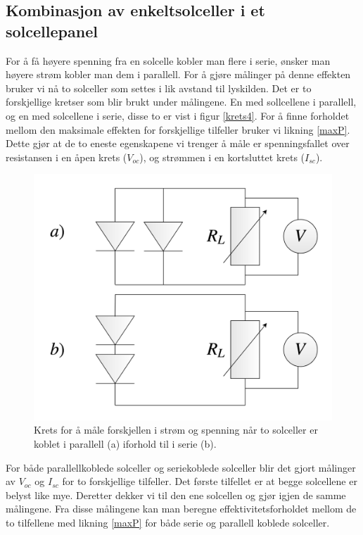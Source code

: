 \documentclass[%
 reprint,
 amsmath,amssymb,
 aps,
 norsk,
 booktabs
]{revtex4-1}
\begin{document}
\subsection{Kombinasjon av enkeltsolceller i et solcellepanel}
For å få høyere spenning fra en solcelle kobler man flere i serie, ønsker man høyere strøm kobler man dem i parallell. For å gjøre målinger på denne effekten bruker vi nå to solceller som settes i lik avstand til lyskilden. Det er to forskjellige kretser som blir brukt under målingene. En med sollcellene i parallell, og en med solcellene i serie, disse to er vist i figur \vref{krets4}. For å finne forholdet mellom den maksimale effekten for forskjellige tilfeller bruker vi likning \eqref{maxP}. Dette gjør at de to eneste egenskapene vi trenger å måle er spenningsfallet over resistansen i en åpen krets ($V_{oc}$), og strømmen i en kortsluttet krets ($I_{sc}$).
\begin{figure}[h!]
  \centering
  \includegraphics[scale=0.16]{krets4.png}
  \caption{Krets for å måle forskjellen i strøm og spenning når to solceller er koblet i parallell (a) iforhold til i serie (b).}
  \label{krets4}
\end{figure}
For både parallellkoblede solceller og seriekoblede solceller blir det gjort målinger av $V_{oc}$ og $I_{sc}$ for to forskjellige tilfeller. Det første tilfellet er at begge solcellene er belyst like mye. Deretter dekker vi til den ene solcellen og gjør igjen de samme målingene. Fra disse målingene kan man beregne effektivitetsforholdet mellom de to tilfellene med likning \eqref{maxP} for både serie og parallell koblede solceller.
\end{document}
